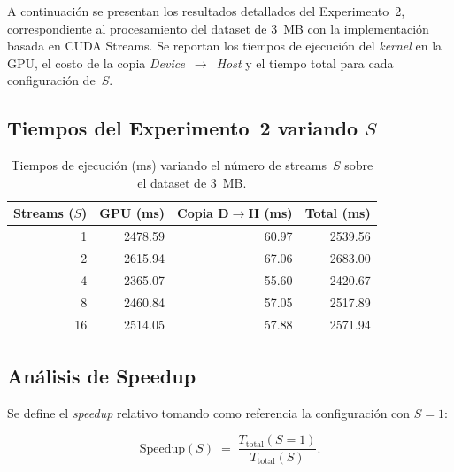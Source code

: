 \documentclass[12pt, a4paper]{article}
\begin{document}
A continuación se presentan los resultados detallados del Experimento~2,
correspondiente al procesamiento del dataset de 3~MB con la implementación
basada en CUDA Streams. Se reportan los tiempos de ejecución del \textit{kernel}
en la GPU, el costo de la copia \textit{Device}~$\to$~\textit{Host} y el
tiempo total para cada configuración de~$S$.

\subsection{Tiempos del Experimento~2 variando $S$}

\begin{table}[H]
    \centering
    \caption{Tiempos de ejecución (ms) variando el número de streams~$S$
             sobre el dataset de 3~MB.}
    \label{tab:tiempos}
    \begin{tabular}{@{} r r r r @{}}
        \toprule
        \textbf{Streams ($S$)} &
        \textbf{GPU (ms)} &
        \textbf{Copia D$\to$H (ms)} &
        \textbf{Total (ms)} \\
        \midrule
         1 & 2478.59 & 60.97 & 2539.56 \\
         2 & 2615.94 & 67.06 & 2683.00 \\
         4 & 2365.07 & 55.60 & 2420.67 \\
         8 & 2460.84 & 57.05 & 2517.89 \\
        16 & 2514.05 & 57.88 & 2571.94 \\
        \bottomrule
    \end{tabular}
\end{table}

\subsection{Análisis de Speedup}

Se define el \textit{speedup} relativo tomando como referencia la configuración
con $S = 1$:

\begin{equation}
    \text{Speedup}(S) \;=\; \frac{T_{\text{total}}(S=1)}{T_{\text{total}}(S)}.
    \label{eq:speedup}
\end{equation}
\end{document}
